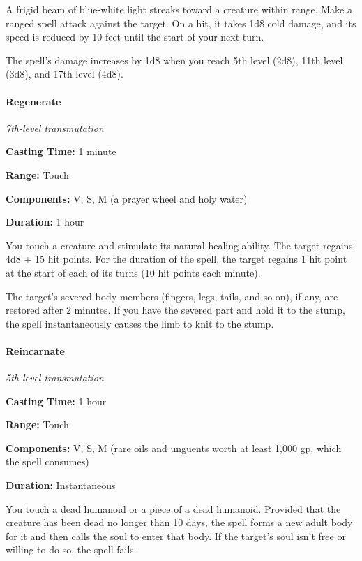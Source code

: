 \documentclass[
]{article}
\begin{document}
A frigid beam of blue-white light streaks toward a creature within
range. Make a ranged spell attack against the target. On a hit, it takes
1d8 cold damage, and its speed is reduced by 10 feet until the start of
your next turn.

The spell's damage increases by 1d8 when you reach 5th level (2d8), 11th
level (3d8), and 17th level (4d8).

\hypertarget{regenerate}{%
\paragraph{Regenerate}\label{regenerate}}

\emph{7th-level transmutation}

\textbf{Casting Time:} 1 minute

\textbf{Range:} Touch

\textbf{Components:} V, S, M (a prayer wheel and holy water)

\textbf{Duration:} 1 hour

You touch a creature and stimulate its natural healing ability. The
target regains 4d8 + 15 hit points. For the duration of the spell, the
target regains 1 hit point at the start of each of its turns (10 hit
points each minute).

The target's severed body members (fingers, legs, tails, and so on), if
any, are restored after 2 minutes. If you have the severed part and hold
it to the stump, the spell instantaneously causes the limb to knit to
the stump.

\hypertarget{reincarnate}{%
\paragraph{Reincarnate}\label{reincarnate}}

\emph{5th-level transmutation}

\textbf{Casting Time:} 1 hour

\textbf{Range:} Touch

\textbf{Components:} V, S, M (rare oils and unguents worth at least
1,000 gp, which the spell consumes)

\textbf{Duration:} Instantaneous

You touch a dead humanoid or a piece of a dead humanoid. Provided that
the creature has been dead no longer than 10 days, the spell forms a new
adult body for it and then calls the soul to enter that body. If the
target's soul isn't free or willing to do so, the spell fails.
\end{document}
